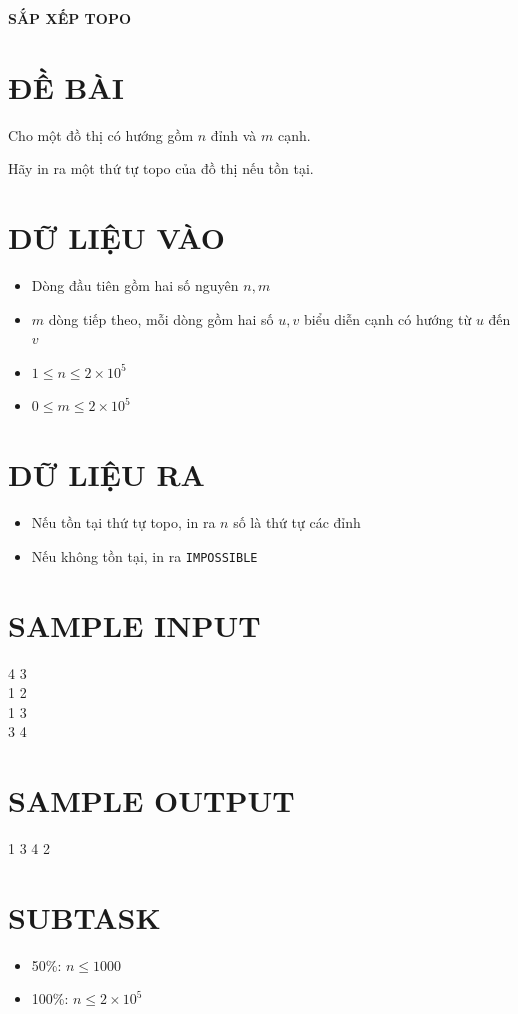\documentclass[a4paper,12pt]{article}
\begin{document}
\begin{center}
    \textbf{\Large SẮP XẾP TOPO}
\end{center}

\section*{ĐỀ BÀI}
Cho một đồ thị có hướng gồm $n$ đỉnh và $m$ cạnh.

Hãy in ra một thứ tự topo của đồ thị nếu tồn tại.

\section*{DỮ LIỆU VÀO}
\begin{itemize}
    \item Dòng đầu tiên gồm hai số nguyên $n, m$
    \item $m$ dòng tiếp theo, mỗi dòng gồm hai số $u, v$ biểu diễn cạnh có hướng từ $u$ đến $v$
    \item $1 \le n \le 2 \times 10^5$
    \item $0 \le m \le 2 \times 10^5$
\end{itemize}

\section*{DỮ LIỆU RA}
\begin{itemize}
    \item Nếu tồn tại thứ tự topo, in ra $n$ số là thứ tự các đỉnh
    \item Nếu không tồn tại, in ra \texttt{IMPOSSIBLE}
\end{itemize}

\section*{SAMPLE INPUT}
\begin{tcolorbox}
4 3 \\
1 2 \\
1 3 \\
3 4
\end{tcolorbox}

\section*{SAMPLE OUTPUT}
\begin{tcolorbox}
1 3 4 2
\end{tcolorbox}

\section*{SUBTASK}
\begin{itemize}
    \item 50\%: $n \le 1000$
    \item 100\%: $n \le 2 \times 10^5$
\end{itemize}
\end{document}
